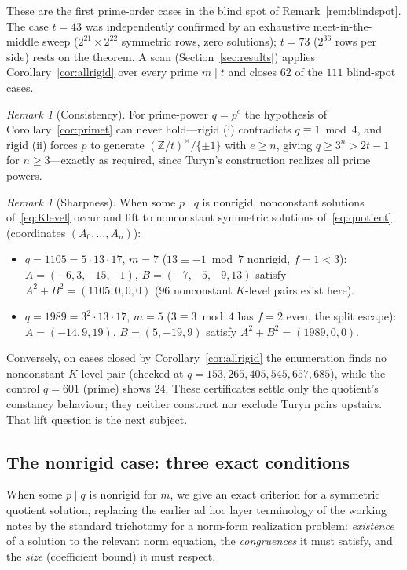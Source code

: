 \documentclass[11pt]{article}
\theoremstyle{plain}
\theoremstyle{definition}
\theoremstyle{remark}
\newtheorem{remark}[theorem]{Remark}
\newcommand{\Z}{\mathbb Z}
\begin{document}
These are the first prime-order cases in the blind spot of
Remark~\ref{rem:blindspot}. The case $t=43$ was independently confirmed by an
exhaustive meet-in-the-middle sweep ($2^{21}\times2^{22}$ symmetric rows, zero
solutions); $t=73$ ($2^{36}$ rows per side) rests on the theorem. A scan
(Section~\ref{sec:results}) applies Corollary~\ref{cor:allrigid} over every
prime $m\mid t$ and closes $62$ of the $111$ blind-spot cases.

\begin{remark}[Consistency]\label{rem:consistency}
For prime-power $q=p^e$ the hypothesis of Corollary~\ref{cor:primet} can never
hold---rigid (i) contradicts $q\equiv1\bmod4$, and rigid (ii) forces $p$ to
generate $(\Z/t)^\times/\{\pm1\}$ with $e\ge n$, giving $q\ge3^n>2t-1$ for
$n\ge3$---exactly as required, since Turyn's construction realizes all prime
powers.
\end{remark}

\begin{remark}[Sharpness]\label{rem:sharp}
When some $p\mid q$ is nonrigid, nonconstant solutions of~\eqref{eq:Klevel}
occur and lift to nonconstant symmetric solutions of~\eqref{eq:quotient}
(coordinates $(A_0,\dots,A_n)$):
\begin{itemize}
\item $q=1105=5\cdot13\cdot17$, $m=7$ ($13\equiv-1\bmod7$ nonrigid, $f=1<3$):
  $A=(-6,3,-15,-1)$, $B=(-7,-5,-9,13)$ satisfy $A^2+B^2=(1105,0,0,0)$ ($96$
  nonconstant $K$-level pairs exist here).
\item $q=1989=3^2\cdot13\cdot17$, $m=5$ ($3\equiv3\bmod4$ has $f=2$ even, the
  split escape): $A=(-14,9,19)$, $B=(5,-19,9)$ satisfy $A^2+B^2=(1989,0,0)$.
\end{itemize}
Conversely, on cases closed by Corollary~\ref{cor:allrigid} the enumeration
finds no nonconstant $K$-level pair (checked at $q=153,265,405,545,657,685$),
while the control $q=601$ (prime) shows $24$. These certificates settle only the
quotient's constancy behaviour; they neither construct nor exclude Turyn pairs
upstairs. That lift question is the next subject.
\end{remark}

\subsection{The nonrigid case: three exact conditions}\label{sec:nonrigid}

When some $p\mid q$ is nonrigid for $m$, we give an exact criterion for a
symmetric quotient solution, replacing the earlier ad hoc layer terminology of
the working notes by the standard trichotomy for a norm-form realization
problem: \emph{existence} of a solution to the relevant norm equation, the
\emph{congruences} it must satisfy, and the \emph{size} (coefficient bound) it
must respect.
\end{document}
